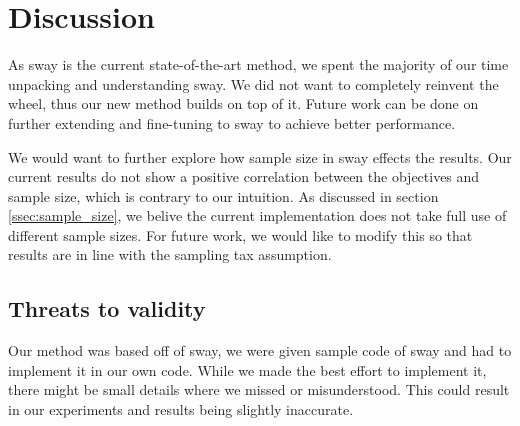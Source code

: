 \section{Discussion}
\label{sec:discussion}

  As sway is the current state-of-the-art method, we spent the majority
  of our time unpacking and understanding sway. We did not want to
  completely reinvent the wheel, thus our new method builds on top of
  it. Future work can be done on further extending and fine-tuning to
  sway to achieve better performance.

  We would want to further explore how sample size in sway effects the
  results. Our current results do not show a positive correlation
  between the objectives and sample size, which is contrary to our
  intuition. As discussed in section \ref{ssec:sample_size}, we belive
  the current implementation does not take full use of different sample
  sizes. For future work, we would like to modify this so that results
  are in line with the sampling tax assumption.

  \subsection{Threats to validity}
    Our method was based off of sway, we were given sample code of sway
    and had to implement it in our own code. While we made the best effort
    to implement it, there might be small details where we missed or
    misunderstood. This could result in our experiments and results being
    slightly inaccurate. 

  